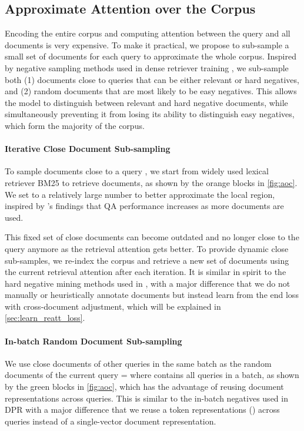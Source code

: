\documentclass[11pt, dvipsnames]{article}
\newcommand{\adjustment}{cross-document adjustment\xspace}
\begin{document}
\subsection{Approximate Attention over the Corpus}\label{sec:learn_reatt_aoc}
Encoding the entire corpus and computing attention between the query and all documents is very expensive.
To make it practical, we propose to sub-sample a small set of documents for each query to approximate the whole corpus.
Inspired by negative sampling methods used in dense retriever training \cite{dpr-2020-karpukhin,ance-2021-xiong,colbert-2020-khattab}, we sub-sample both (1) documents close to queries that can be either relevant or hard negatives, and (2) random documents that are most likely to be easy negatives.
This allows the model to distinguish between relevant and hard negative documents, while simultaneously preventing it from losing its ability to distinguish easy negatives, which form the majority of the corpus.

\paragraph{Iterative Close Document Sub-sampling}
To sample documents close to a query , we start from widely used lexical retriever BM25 \cite{bm25-2009-robertson} to retrieve  documents, as shown by the orange blocks in \autoref{fig:aoc}.
We set  to a relatively large number to better approximate the local region, inspired by \citet{fid-2021-izacard}'s findings that QA performance increases as more documents are used.

This fixed set of close documents can become outdated and no longer close to the query anymore as the retrieval attention gets better.
To provide dynamic close sub-samples, we re-index the corpus and retrieve a new set of  documents using the current retrieval attention after each iteration.
It is similar in spirit to the hard negative mining methods used in \citet{dpr-2020-karpukhin,colbertnq-2020-khattab}, with a major difference that we do not manually or heuristically annotate documents but instead learn from the end loss with \adjustment, which will be explained in \autoref{sec:learn_reatt_loss}.

\paragraph{In-batch Random Document Sub-sampling}
We use close documents of other queries in the same batch as the random documents of the current query  =  where  contains all queries in a batch, as shown by the green blocks in \autoref{fig:aoc}, which has the advantage of reusing document representations across queries.
This is similar to the in-batch negatives used in DPR \cite{dpr-2020-karpukhin} with a major difference that we reuse a token representations () across queries instead of a single-vector document representation.
\end{document}
